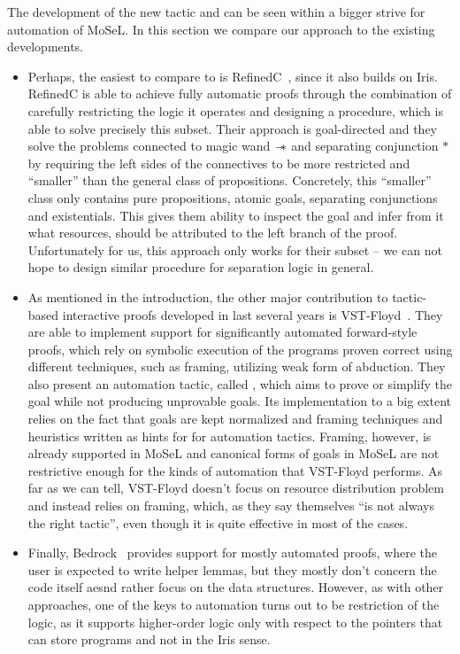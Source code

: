 The development of the new  tactic and  can be seen within a bigger strive for automation of MoSeL.
In this section we compare our approach to the existing developments.

\begin{itemize}
\item Perhaps, the easiest to compare to is RefinedC~\cite{sammlerRefinedCExtensibleRefinement2020}, since it also builds on Iris.
  RefinedC is able to achieve fully automatic proofs through the combination of carefully restricting the logic it operates and designing a procedure, which is able to solve precisely this subset.
  Their approach is goal-directed and they solve the problems connected to magic wand \(\mathrel{-\mkern-6mu*}\) and separating conjunction \(*\) by requiring the left sides of the connectives to be more restricted and ``smaller'' than the general class of propositions.
  Concretely, this ``smaller'' class only contains pure propositions, atomic goals, separating conjunctions and existentials.
  This gives them ability to inspect the goal and infer from it what resources, should be attributed to the left branch of the proof.
  Unfortunately for us, this approach only works for their subset -- we can not hope to design similar procedure for separation logic in general.
\item As mentioned in the introduction, the other major contribution to tactic-based interactive proofs developed in last several years is VST-Floyd~\cite{caoVSTFloydSeparationLogic2018}.
  They are able to implement support for significantly automated forward-style proofs, which rely on symbolic execution of the programs proven correct using different techniques, such as framing, utilizing weak form of abduction.
  They also present an automation tactic, called , which aims to prove or simplify the goal while not producing unprovable goals.
  Its implementation to a big extent relies on the fact that goals are kept normalized and framing techniques and heuristics written as hints for for automation tactics.
  Framing, however, is already supported in MoSeL and canonical forms of goals in MoSeL are not restrictive enough for the kinds of automation that VST-Floyd performs.
  As far as we can tell, VST-Floyd doesn't focus on resource distribution problem and instead relies on framing, which, as they say themselves ``is not always the right tactic'', even though it is quite effective in most of the cases.
\item Finally, Bedrock~\cite{chlipalaMostlyautomatedVerificationLowlevel2011, chlipalaBedrockStructuredProgramming2013} provides support for mostly automated proofs, where the user is expected to write helper lemmas, but they mostly don't concern the code itself aesnd rather focus on the data structures.
  However, as with other approaches, one of the keys to automation turns out to be restriction of the logic, as it supports higher-order logic only with respect to the pointers that can store programs and not in the Iris sense.
\end{itemize}

